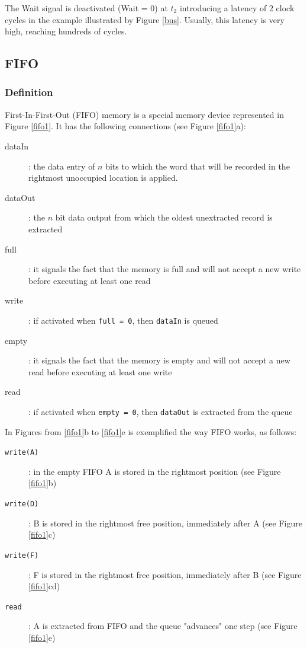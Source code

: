 The Wait signal is deactivated (Wait = 0) at $t_2$ introducing a latency of 2 clock cycles in the example illustrated by Figure \ref{bus}. Usually, this latency is very high, reaching hundreds of cycles.


\subsection{FIFO}

\subsubsection{Definition}

First-In-First-Out (FIFO) memory is a special memory device represented in Figure \ref{fifo1}. It has the following connections (see Figure \ref{fifo1}a):


\begin{description}
    \item[dataIn]: the data entry of $n$ bits to which the word that will be recorded in the rightmost unoccupied location is applied.
    \item[dataOut]: the $n$ bit data output from which the oldest unextracted record is extracted
    \item[full]: it signals the fact that the memory is full and will not accept a new write before executing at least one read
    \item[write]: if activated when {\tt full = 0}, then {\tt dataIn} is queued
    \item[empty]: it signals the fact that the memory is empty and will not accept a new read before executing at least one write
    \item[read]: if activated when {\tt empty = 0}, then {\tt dataOut} is extracted from the  queue
\end{description}

In Figures from \ref{fifo1}b to \ref{fifo1}e is exemplified the way FIFO works, as follows:
\begin{description}
    \item[{\tt write(A)}]: in the empty FIFO A is stored in the rightmost position (see Figure \ref{fifo1}b)
    \item[{\tt write(D)}]: B is stored in the rightmost free position, immediately after A (see Figure \ref{fifo1}c)
    \item[{\tt write(F)}]: F is stored in the rightmost free position, immediately after B (see Figure \ref{fifo1}cd)
    \item[{\tt read}]: A is extracted from FIFO and the queue "advances" one step (see Figure \ref{fifo1}e)
\end{description}

